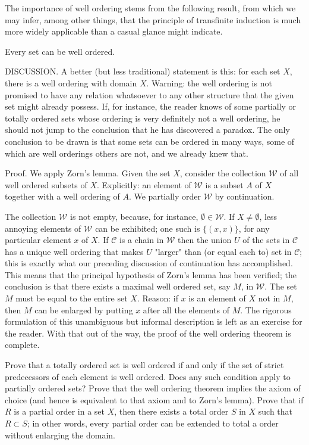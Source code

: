 The importance of well ordering stems from the following result, from which we may infer, among other things, that the principle of transfinite induction is much more widely applicable than a casual glance might indicate. 

\begin{named} Every set can be well ordered. 
\end{named}

DISCUSSION. A better (but less traditional) statement is this: for each set $X$, there is a well ordering with domain $X$. Warning: the well ordering is not promised to have any relation whatsoever to any other structure that the given set might already possess. If, for instance, the reader knows of some partially or totally ordered sets whose ordering is very definitely not a well ordering, he should not jump to the conclusion that he has discovered a paradox. The only conclusion to be drawn is that some sets can be ordered in many ways, some of which are well orderings others are not, and we already knew that. 

Proof. We apply Zorn's lemma. Given the set $X$, consider the collection $\mathcal{W}$ of all well ordered subsets of $X$. Explicitly: an element of $\mathcal{W}$ is a subset $A$ of $X$ together with a well ordering of $A$. We partially order $\mathcal{W}$ by continuation. 

The collection $\mathcal{W}$ is not empty, because, for instance, $\emptyset \in \mathcal{W}$. If $X \neq \emptyset$, less annoying elements of $\mathcal{W}$ can be exhibited; one such is $\{ (x,x) \}$, for any particular element $x$ of $X$. If $\mathcal{C}$ is a chain in $\mathcal{W}$ then the union $U$ of the sets in $\mathcal{C}$ has a unique well ordering that makes $U$ "larger" than (or equal each to) set in $\mathcal{C}$; this is exactly what our preceding discussion of continuation has accomplished. This means that the principal hypothesis of Zorn's lemma has been verified; the conclusion is that there exists a maximal well ordered set, say $M$, in $\mathcal{W}$. The set $M$ must be equal to the entire set $X$. Reason: if $x$ is an element of $X$ not in $M$, then $M$ can be enlarged by putting $x$ after all the elements of $M$. The rigorous formulation of this unambiguous but informal description is left as an exercise for the reader. With that out of the way, the proof of the well ordering theorem is complete. 

\begin{named}[Exercise. ] Prove that a totally ordered set is well ordered if and only if the set of strict predecessors of each element is well ordered. Does any such condition apply to partially ordered sets? Prove that the well ordering theorem implies the axiom of choice (and hence is equivalent to that axiom and to Zorn's lemma). Prove that if $R$ is a partial order in a set $X$, then there exists a total order $S$ in $X$ such that $R \subset S$; in other words, every partial order can be extended to total a order without enlarging the domain.
\end{named}